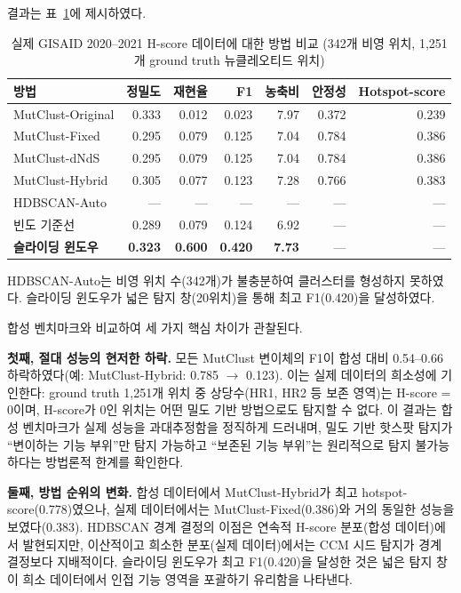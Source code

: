 결과는 표~\ref{tab:real_gisaid}에 제시하였다.

\begin{table}[htbp]
\centering
\caption{실제 GISAID 2020--2021 H-score 데이터에 대한 방법 비교 (342개 비영 위치, 1,251개 ground truth 뉴클레오티드 위치)}
\label{tab:real_gisaid}
\begin{tabular}{lrrrrrr}
\toprule
\textbf{방법} & \textbf{정밀도} & \textbf{재현율} & \textbf{F1} & \textbf{농축비} & \textbf{안정성} & \textbf{Hotspot-score} \\
\midrule
MutClust-Original & 0.333 & 0.012 & 0.023 & 7.97 & 0.372 & 0.239 \\
MutClust-Fixed & 0.295 & 0.079 & 0.125 & 7.04 & 0.784 & 0.386 \\
MutClust-dNdS & 0.295 & 0.079 & 0.125 & 7.04 & 0.784 & 0.386 \\
MutClust-Hybrid & 0.305 & 0.077 & 0.123 & 7.28 & 0.766 & 0.383 \\
HDBSCAN-Auto & --- & --- & --- & --- & --- & --- \\
\midrule
빈도 기준선 & 0.289 & 0.079 & 0.124 & 6.92 & --- & --- \\
\textbf{슬라이딩 윈도우} & \textbf{0.323} & \textbf{0.600} & \textbf{0.420} & \textbf{7.73} & --- & --- \\
\bottomrule
\end{tabular}
\begin{minipage}{\textwidth}
\smallskip
\footnotesize HDBSCAN-Auto는 비영 위치 수(342개)가 불충분하여 클러스터를 형성하지 못하였다. 슬라이딩 윈도우가 넓은 탐지 창(20위치)을 통해 최고 F1(0.420)을 달성하였다.
\end{minipage}
\end{table}

합성 벤치마크와 비교하여 세 가지 핵심 차이가 관찰된다.

\textbf{첫째, 절대 성능의 현저한 하락.}
모든 MutClust 변이체의 F1이 합성 대비 0.54--0.66 하락하였다(예: MutClust-Hybrid: 0.785 $\to$ 0.123).
이는 실제 데이터의 희소성에 기인한다: ground truth 1,251개 위치 중 상당수(HR1, HR2 등 보존 영역)는 H-score = 0이며, H-score가 0인 위치는 어떤 밀도 기반 방법으로도 탐지할 수 없다.
이 결과는 합성 벤치마크가 실제 성능을 과대추정함을 정직하게 드러내며, 밀도 기반 핫스팟 탐지가 ``변이하는 기능 부위''만 탐지 가능하고 ``보존된 기능 부위''는 원리적으로 탐지 불가능하다는 방법론적 한계를 확인한다.

\textbf{둘째, 방법 순위의 변화.}
합성 데이터에서 MutClust-Hybrid가 최고 hotspot-score(0.778)였으나, 실제 데이터에서는 MutClust-Fixed(0.386)와 거의 동일한 성능을 보였다(0.383).
HDBSCAN 경계 결정의 이점은 연속적 H-score 분포(합성 데이터)에서 발현되지만, 이산적이고 희소한 분포(실제 데이터)에서는 CCM 시드 탐지가 경계 결정보다 지배적이다.
슬라이딩 윈도우가 최고 F1(0.420)을 달성한 것은 넓은 탐지 창이 희소 데이터에서 인접 기능 영역을 포괄하기 유리함을 나타낸다.

